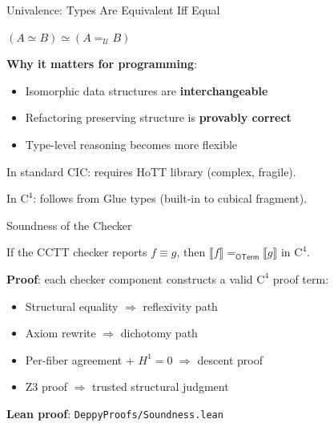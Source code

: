 \documentclass[aspectratio=169,11pt]{beamer}
\newcommand{\Cfour}{\mathrm{C}^4}
\newcommand{\OTerm}{\mathsf{OTerm}}
\newcommand{\den}[1]{\llbracket #1 \rrbracket}
\begin{document}
\begin{frame}{Univalence: Types Are Equivalent Iff Equal}
\begin{theorem}[Univalence]
$(A \simeq B) \simeq (A =_{\mathcal{U}} B)$
\end{theorem}

\vspace{0.5em}
\textbf{Why it matters for programming}:
\begin{itemize}
\item Isomorphic data structures are \textbf{interchangeable}
\item Refactoring preserving structure is \textbf{provably correct}
\item Type-level reasoning becomes more flexible
\end{itemize}

\vspace{0.5em}
In standard CIC: requires HoTT library (complex, fragile).

In $\Cfour$: follows from Glue types (built-in to cubical fragment).
\end{frame}

\begin{frame}{Soundness of the Checker}
\begin{theorem}[Soundness]
If the CCTT checker reports $f \equiv g$, then $\den{f} =_\OTerm \den{g}$ in $\Cfour$.
\end{theorem}

\vspace{0.5em}
\textbf{Proof}: each checker component constructs a valid $\Cfour$ proof term:
\begin{itemize}
\item Structural equality $\Rightarrow$ reflexivity path
\item Axiom rewrite $\Rightarrow$ dichotomy path
\item Per-fiber agreement + $H^1 = 0$ $\Rightarrow$ descent proof
\item Z3 proof $\Rightarrow$ trusted structural judgment
\end{itemize}

\vspace{0.3em}
\textbf{Lean proof}: \texttt{DeppyProofs/Soundness.lean}
\end{frame}
\end{document}
